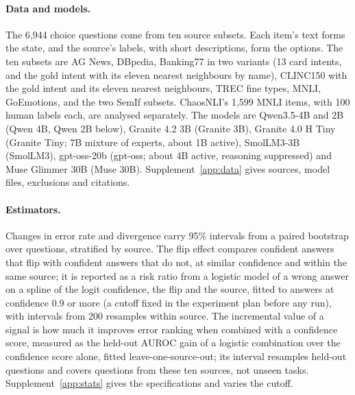 \documentclass[10pt,twocolumn]{article}
\begin{document}
\paragraph{Data and models.} The 6,944 choice questions come from ten source subsets. Each item's text forms the state, and the source's labels, with short descriptions, form the options. The ten subsets are AG News, DBpedia, Banking77 in two variants (13 card intents, and the gold intent with its eleven nearest neighbours by name), CLINC150 with the gold intent and its eleven nearest neighbours, TREC fine types, MNLI, GoEmotions, and the two SemIf subsets. ChaosNLI's 1,599 MNLI items, with 100 human labels each, are analysed separately. The models are Qwen3.5-4B and 2B (Qwen 4B, Qwen 2B below), Granite 4.2 3B (Granite 3B), Granite 4.0 H Tiny (Granite Tiny; 7B mixture of experts, about 1B active), SmolLM3-3B (SmolLM3), gpt-oss-20b (gpt-oss; about 4B active, reasoning suppressed) and Muse Glimmer 30B (Muse 30B). Supplement~\ref{app:data} gives sources, model files, exclusions and citations.

\begin{table}[t]
\centering\footnotesize

\caption{Error rates, the confident-flip association and ChaosNLI divergence on seven models, 6,944 questions each, fixed budget of at most seven distinct orders. Relative-change intervals are paired bootstraps over questions and all exclude zero; adjusted-risk-ratio intervals all exclude one. Confident answers: base-order confidence 0.9 or more. Adjusted risk ratio: wrong-answer rate of confident answers that change under some order over those that do not, adjusted for a spline of confidence and for source. ChaosNLI: Jensen--Shannon divergence in bits from the 100-annotator distribution over 1,599 items. Every signal evaluated on both error targets is in Supplement Table~\ref{tab:signals}.}
\label{tab:models}
\end{table}

\paragraph{Estimators.} Changes in error rate and divergence carry 95\% intervals from a paired bootstrap over questions, stratified by source. The flip effect compares confident answers that flip with confident answers that do not, at similar confidence and within the same source; it is reported as a risk ratio from a logistic model of a wrong answer on a spline of the logit confidence, the flip and the source, fitted to answers at confidence 0.9 or more (a cutoff fixed in the experiment plan before any run), with intervals from 200 resamples within source. The incremental value of a signal is how much it improves error ranking when combined with a confidence score, measured as the held-out AUROC gain of a logistic combination over the confidence score alone, fitted leave-one-source-out; its interval resamples held-out questions and covers questions from these ten sources, not unseen tasks. Supplement~\ref{app:stats} gives the specifications and varies the cutoff.
\end{document}
